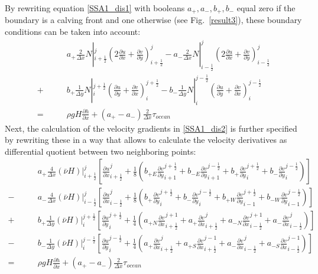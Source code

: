 \documentclass[a4paper,10pt]{article}
\begin{document}
By rewriting equation \eqref{SSA1_dis1} with booleans $a_+, a_-, b_+, b_-$ equal zero if the boundary is a calving front and one otherwise (see Fig.~\ref{result3}), these boundary conditions can be taken into account:
\begin{align}
&\qquad a_+\frac{2}{\Delta x}N|_{i+\frac{1}{2}}^j\left( 2\frac{\partial u}{\partial x} + \frac{\partial v}{\partial y} \right)_{i+\frac{1}{2}}^j
- a_-\frac{2}{\Delta x}N|_{i-\frac{1}{2}}^j\left( 2\frac{\partial u}{\partial x} + \frac{\partial v}{\partial y} \right)_{i-\frac{1}{2}}^j \nonumber \\
+ &\qquad b_+\frac{1}{\Delta y}N|_i^{j+\frac{1}{2}}\left(\frac{\partial u}{\partial y}+\frac{\partial v}{\partial x}\right)_i^{j+\frac{1}{2}} 
- b_-\frac{1}{\Delta y}N|_i^{j-\frac{1}{2}}\left(\frac{\partial u}{\partial y}+\frac{\partial v}{\partial x}\right)_i^{j-\frac{1}{2}} \nonumber \\
= &\qquad \rho gH \frac{\partial h}{\partial x} + (a_+ - a_-)\frac{2}{\Delta x}\tau_{ocean} \label{SSA1_dis2}
\end{align}
Next, the calculation of the velocity gradients in \eqref{SSA1_dis2} is further specified by rewriting these in a way that allows to calculate the velocity derivatives as differential quotient between two neighboring points:
\begin{align}
&\qquad a_+\frac{4}{\Delta x}(\bar{\nu}H)|_{i+\frac{1}{2}}^j\left[\frac{\partial u}{\partial x}_{i+\frac{1}{2}}^j + \frac{1}{8}\left( b_{+E}\frac{\partial v}{\partial y}_{i+1}^{j+\frac{1}{2}}+b_{-E}\frac{\partial v}{\partial y}_{i+1}^{j-\frac{1}{2}}+b_+\frac{\partial v}{\partial y}_{i}^{j+\frac{1}{2}}+b_-\frac{\partial v}{\partial y}_{i}^{j-\frac{1}{2}}  \right) \right] \nonumber \\
- &\qquad a_-\frac{4}{\Delta x}(\bar{\nu}H)|_{i-\frac{1}{2}}^j\left[\frac{\partial u}{\partial x}_{i-\frac{1}{2}}^j + \frac{1}{8}\left( b_+\frac{\partial v}{\partial y}_{i}^{j+\frac{1}{2}} + b_-\frac{\partial v}{\partial y}_{i}^{j-\frac{1}{2}} + b_{+W}\frac{\partial v}{\partial y}_{i-1}^{j+\frac{1}{2}} + b_{-W}\frac{\partial v}{\partial y}_{i-1}^{j-\frac{1}{2}} \right) \right] \nonumber \\
+ &\qquad b_+\frac{1}{\Delta y}(\bar{\nu}H)|_i^{j+\frac{1}{2}}\left[\frac{\partial u}{\partial y}_i^{j+\frac{1}{2}}+\frac{1}{4}\left( a_{+N}\frac{\partial v}{\partial x}_{i+\frac{1}{2}}^{j+1} + a_+\frac{\partial v}{\partial x}_{i+\frac{1}{2}}^{j} + a_{-N}\frac{\partial v}{\partial x}_{i-\frac{1}{2}}^{j+1} + a_-\frac{\partial v}{\partial x}_{i-\frac{1}{2}}^{j} \right) \right] \nonumber \\
- &\qquad b_-\frac{1}{\Delta y} (\bar{\nu}H)|_i^{j-\frac{1}{2}} \left[\frac{\partial u}{\partial y}_i^{j-\frac{1}{2}}+\frac{1}{4}\left( a_+\frac{\partial v}{\partial x}_{i+\frac{1}{2}}^{j} + a_{+S}\frac{\partial v}{\partial x}_{i+\frac{1}{2}}^{j-1} + a_-\frac{\partial v}{\partial x}_{i-\frac{1}{2}}^{j} + a_{-S}\frac{\partial v}{\partial x}_{i-\frac{1}{2}}^{j-1} \right) \right] \nonumber \\
= &\qquad \rho gH \frac{\partial h}{\partial x} + (a_+ - a_-)\frac{2}{\Delta x}\tau_{ocean} \label{SSA1_dis3}
\end{align}
\end{document}
